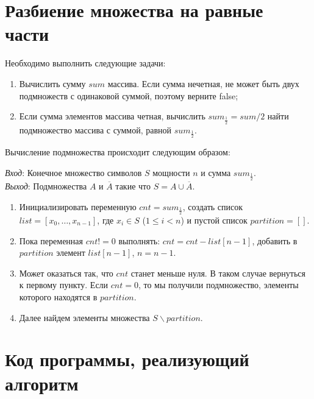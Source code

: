 \documentclass[bachelor, och, labwork]{shiza}
\begin{document}


\tableofcontents


\section{Разбиение множества на равные части}

Необходимо выполнить следующие задачи:

\begin{enumerate}
  \item Вычислить сумму $sum$ массива. Если сумма нечетная, не может быть двух подмножеств с одинаковой суммой, поэтому верните false;
  \item Если сумма элементов массива четная, вычислить $sum_{\frac{1}{2}} = sum / 2$ найти подмножество массива с суммой, равной $sum_{\frac{1}{2}}$.
\end{enumerate}

  Вычисление подмножества происходит следующим образом:

  \textit{Вход}: Конечное множество символов $S$ мощности $n$ и сумма $sum_{\frac{1}{2}}$.\\

  \textit{Выход}: Подмножества $A$ и $\overline{A}$ такие что $S = A \cup \overline{A}$.\\
  \begin{enumerate}
    \item Инициализировать переменную $cnt = sum_{\frac{1}{2}}$, создать список $list = [x_0, \dots , x_{n - 1}]$, где $x_i \in S$ ($1 \leq i < n$) и
    пустой список $partition = []$.
    \item Пока переменная $cnt != 0$ выполнять: $cnt = cnt - list[n - 1]$, добавить в $partition$ элемент $list[n - 1]$, $n = n - 1$.
    \item Может оказаться так, что $cnt$ станет меньше нуля. В таком случае вернуться к первому пункту. Если $cnt = 0$, то мы получили подмножество, 
    элементы которого находятся в $partition$.
    \item Далее найдем элементы множества $S \backslash partition$.  
  \end{enumerate}
  
  \section{Код программы, реализующий алгоритм}
\end{document}
